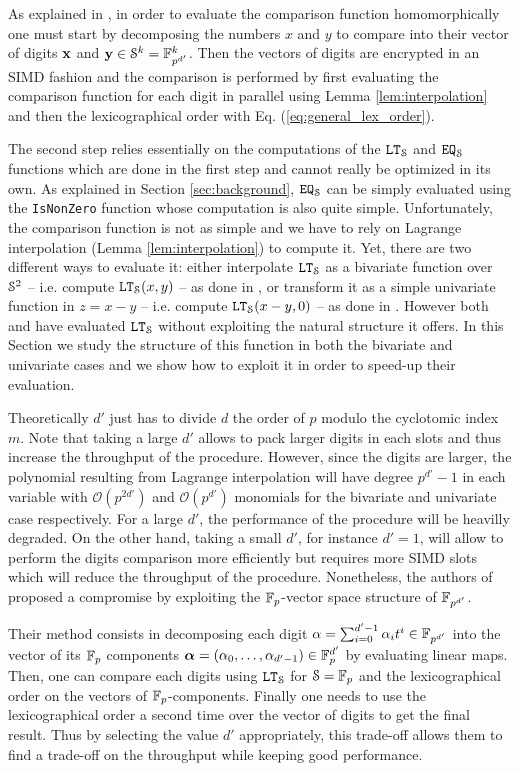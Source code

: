 As explained in \cite{TLWRK20}, in order to evaluate the comparison function homomorphically one must start by decomposing the numbers $x$ and $y$ to compare into their vector of digits $\vx$ and $\vy\in\S^k = \F_{p^{d'}}^k$. Then the vectors of digits are encrypted in an SIMD fashion and the comparison is performed by first evaluating the comparison function for each digit in parallel using Lemma \ref{lem:interpolation} and then the lexicographical order with Eq. (\ref{eq:general_lex_order}).

The second step relies essentially on the computations of the $\LT_{\S}$ and $\EQ_\S$ functions which are done in the first step and cannot really be optimized in its own. As explained in Section \ref{sec:background}, $\EQ_{\S}$ can be simply evaluated using the \texttt{IsNonZero} function whose computation is also quite simple.
Unfortunately, the comparison function is not as simple and we have to rely on Lagrange interpolation (Lemma \ref{lem:interpolation}) to compute it. Yet, there are two different ways to evaluate it: either interpolate $\LT_\S$ as a bivariate function over $\S^2$  -- i.e. compute $\LT_\S(x,y)$ -- as done in \cite{TLWRK20}, or transform it as a simple univariate function in $z=x-y$ -- i.e. compute $\LT_\S(x-y,0)$ -- as done in \cite{AINA:NGEG17}. However both \cite{AINA:NGEG17} and \cite{TLWRK20} have evaluated $\LT_\S$ without exploiting the natural structure it offers. In this Section we study the structure of this function in both the bivariate and univariate cases and we show how to exploit it in order to speed-up their evaluation.

Theoretically $d'$ just has to divide $d$ the order of $p$ modulo the cyclotomic index $m$. Note that taking a large $d'$ allows to pack larger digits in each slots and thus increase the throughput of the procedure. However, since the digits are larger, the polynomial resulting from Lagrange interpolation will have degree $p^{d'}-1$ in each variable with $\mathcal{O}(p^{2d'})$ and $\mathcal{O}(p^{d'})$ monomials for the bivariate and univariate case respectively. For a large $d'$, the performance of the procedure will be heavilly degraded. On the other hand, taking a small $d'$, for instance $d'=1$, will allow to perform the digits comparison more efficiently but requires more SIMD slots which will reduce the throughput of the procedure. Nonetheless, the authors of \cite{TLWRK20} proposed a compromise by exploiting the $\F_p$-vector space structure of $\F_{p^{d'}}$.

Their method consists in decomposing each digit $\alpha = \sum_{i=0}^{d'-1}\alpha_i t^i\in\F_{p^{d'}}$ into the vector of its $\F_p$ components $\bm{\alpha} = (\alpha_0,\ldots,\alpha_{d'-1})\in\F_p^{d'}$ by evaluating linear maps. Then, one can compare each digits using $\LT_\S$ for $\S=\F_p$ and the lexicographical order on the vectors of $\F_p$-components. Finally one needs to use the lexicographical order a second time over the vector of digits to get the final result. Thus by selecting the value $d'$ appropriately, this trade-off allows them to find a trade-off on the throughput while keeping good performance.  

